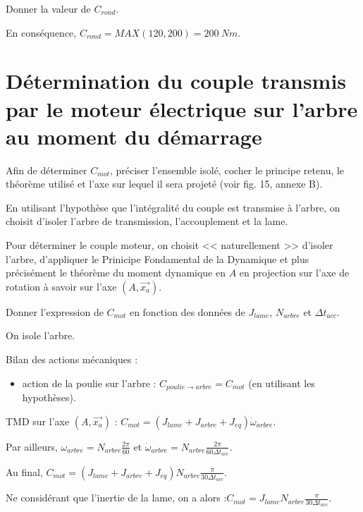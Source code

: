 \documentclass[11pt]{article}
\begin{document}
\UPSTIquestion Donner la valeur de $C_{rond}$.

\begin{UPSTIcorrige}
En conséquence, $C_{rond} = MAX(120,200) = \SI{200}{Nm}$. 
\end{UPSTIcorrige}

\section{Détermination du couple transmis par le moteur électrique sur l'arbre au moment du démarrage}

\UPSTIquestion* Afin de déterminer $C_{mot}$, préciser l'ensemble isolé, cocher le principe retenu, le théorème utilisé et l'axe sur lequel il sera projeté (voir fig. 15, annexe B). 

\begin{UPSTIcorrige}
En utilisant l'hypothèse que l’intégralité du couple est transmise à l'arbre, on choisit d'isoler l'arbre de transmission, l'accouplement et la lame. 

Pour déterminer le couple moteur, on choisit << naturellement >> d'isoler l'arbre, d'appliquer le Prinicipe Fondamental de la Dynamique et plus précisément le théorème du moment dynamique en $A$ en projection sur l'axe de rotation à savoir sur l'axe $\left(A,\overrightarrow{x_a}\right)$.
 \end{UPSTIcorrige}

\UPSTIquestion Donner l'expression de $C_{mot}$ en fonction des données de $J_{lame}$, $N_{arbre}$ et $\Delta t_{acc}$. 

\begin{UPSTIcorrige}
On isole l'arbre.

Bilan des actions mécaniques :
\begin{itemize}
\item action de la poulie sur l'arbre : $  C_{poulie\rightarrow arbre} = C_{mot}$ (en utilisant les hypothèses).
\end{itemize}

TMD sur l'axe $\left(A,\overrightarrow{x_a}\right)$ :
$  C_{mot} = \left(J_{lame}+J_{arbre}+J_{eq}\right) \dot{\omega}_{arbre}$.

Par ailleurs, $\omega_{arbre}  = N_{arbre} \frac{2\pi}{60}$ et  $\dot{\omega}_{arbre} = N_{arbre} \frac{2\pi}{60 \Delta t_{acc}}$.

Au final, $  C_{mot} = \left(J_{lame}+J_{arbre}+J_{eq}\right) N_{arbre} \frac{\pi}{30 \Delta t_{acc}}$.

Ne considérant que l'inertie de la lame, on a alors :$  C_{mot} = J_{lame} N_{arbre} \frac{\pi}{30 \Delta t_{acc}}$.
\end{UPSTIcorrige}
\end{document}
